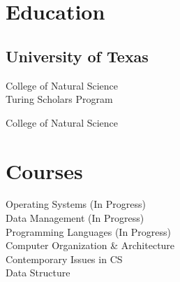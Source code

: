 \documentclass[]{deedy-resume-openfont}
\begin{document}
%
%

%
%



%
%

\begin{minipage}[t]{0.33\textwidth} 


\section{Education} 

\subsection{University of Texas}

\vspace{\topsep} %

College of Natural Science \\
Turing Scholars Program \\
\sectionsep

College of Natural Science \\
\sectionsep




\section{Courses}

Operating Systems (In Progress) \\
Data Management (In Progress) \\
Programming Languages (In Progress) \\
Computer Organization \& Architecture \\
Contemporary Issues in CS \\
Data Structure \\
\sectionsep


\end{minipage}
\end{document}
